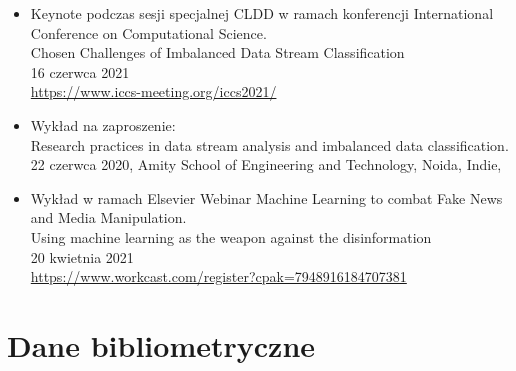 \begin{itemize}
    \item Keynote podczas sesji specjalnej CLDD w ramach konferencji International Conference on Computational Science.\\\vspace{.5em}
    {\large Chosen Challenges of Imbalanced Data Stream Classification}\\
    16 czerwca 2021\\
    \url{https://www.iccs-meeting.org/iccs2021/}
    \item Wykład na zaproszenie:\\\vspace{.5em}
    {\large Research practices in data stream analysis and imbalanced data classification.}\\
    22 czerwca 2020, Amity School of Engineering and Technology, Noida, Indie,
    \item Wykład w ramach Elsevier Webinar Machine Learning to combat Fake News and Media Manipulation.\\\vspace{.5em}
    {\large Using machine learning as the weapon against the disinformation}\\
    20 kwietnia 2021\\
    \url{https://www.workcast.com/register?cpak=7948916184707381}
\end{itemize}

\section{Dane bibliometryczne}


